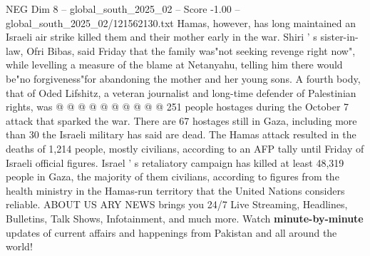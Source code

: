 \begin{textsample}{NEG Dim 8 – global\_south\_2025\_02 – Score -1.00 – global\_south\_2025\_02/121562130.txt}
Hamas, however, has long maintained an Israeli air strike killed them and their mother early in the war.
Shiri ' s sister-in-law, Ofri Bibas, said Friday that the family was"not seeking revenge right now", while levelling a measure of the blame at Netanyahu, telling him there would be"no forgiveness"for abandoning the mother and her young sons.
A fourth body, that of Oded Lifshitz, a veteran journalist and long-time defender of Palestinian rights, was @ @ @ @ @ @ @ @ @ @ 251 people hostages during the October 7 attack that sparked the war.
There are 67 hostages still in Gaza, including more than 30 the Israeli military has said are dead.
The Hamas attack resulted in the deaths of 1,214 people, mostly civilians, according to an AFP tally until Friday of Israeli official figures.
Israel ' s retaliatory campaign has killed at least 48,319 people in Gaza, the majority of them civilians, according to figures from the health ministry in the Hamas-run territory that the United Nations considers reliable.
ABOUT US ARY NEWS brings you 24/7 Live Streaming, Headlines, Bulletins, Talk Shows, Infotainment, and much more.
Watch \textbf{minute-by-minute} updates of current affairs and happenings from Pakistan and all around the world!

\end{textsample}
